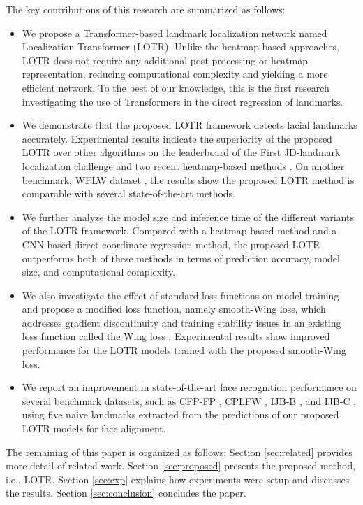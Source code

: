 \documentclass[journal]{IEEEtran}
\begin{document}
The key contributions of this research are summarized as follows:
\begin{itemize}
\item We propose a Transformer-based landmark localization network named Localization Transformer (LOTR).
Unlike the heatmap-based approaches, LOTR does not require any additional post-processing or heatmap representation, reducing computational complexity and yielding a more efficient network.
To the best of our knowledge, this is the first research investigating the use of Transformers in the direct regression of landmarks.

\item We demonstrate that the proposed LOTR framework detects facial landmarks accurately.  
Experimental results indicate the superiority of the proposed LOTR over other algorithms on the leaderboard of the First JD-landmark localization challenge and two recent heatmap-based methods \cite{earp2021sub, xiong2020}.
On another benchmark, WFLW dataset \cite{Wu2018}, the results show the proposed LOTR method is comparable with several state-of-the-art methods.

\item We further analyze the model size and inference time of the different variants of the LOTR framework. 
Compared with a heatmap-based method \cite{earp2021sub} and a CNN-based direct coordinate regression method, the proposed LOTR outperforms both  of these methods in terms of prediction accuracy, model size, and computational complexity.

\item We also investigate the effect of standard loss functions on model training and propose a modified loss function, namely smooth-Wing loss, which addresses gradient discontinuity and training stability issues in an existing loss function called the Wing loss \cite{Feng2017}. 
Experimental results show improved performance for the LOTR models trained with the proposed smooth-Wing loss.

\item We report an improvement in state-of-the-art face recognition performance on several benchmark datasets, such as CFP-FP \cite{cfp-fp}, CPLFW \cite{cplfw}, IJB-B \cite{ijbb}, and IJB-C \cite{ijbc}, using five naive landmarks extracted from the predictions of our proposed LOTR models for face alignment.

\end{itemize}

The remaining of this paper is organized as follows:
Section \ref{sec:related} provides more detail of related work.
Section \ref{sec:proposed} presents the proposed method, i.e., LOTR.
Section \ref{sec:exp} explains how experiments were setup and discusses the results.
Section \ref{sec:conclusion} concludes the paper.
\end{document}
